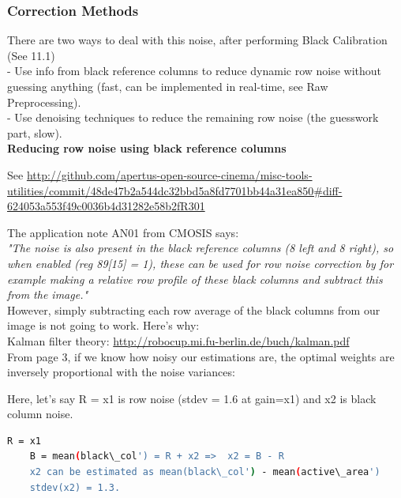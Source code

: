 \subsubsection{Correction Methods}

There are two ways to deal with this noise, after performing Black Calibration (See 11.1)\\

- Use info from black reference columns to reduce dynamic row noise without guessing anything (fast, can be implemented in real-time, see Raw Preprocessing).\\
- Use denoising techniques to reduce the remaining row noise (the guesswork part, slow).\\

\textbf{Reducing row noise using black reference columns}

See \href{http://github.com/apertus-open-source-cinema/misc-tools-utilities/commit/48de47b2a544dc32bbd5a8fd7701bb44a31ea850#diff-624053a553f49c0036b4d31282e58b2fR301}{http://github.com/apertus-open-source-cinema/misc-tools-utilities/commit/48de47b2a544dc32bbd5a8fd7701bb44a31ea850\#diff-624053a553f49c0036b4d31282e58b2fR301}

The application note AN01 from CMOSIS says:\\

\textit{"The noise is also present in the black reference columns (8 left and 8 right), so when enabled (reg 89[15] = 1), these can be used for row noise correction by for example making a relative row profile of these black columns and subtract this from the image."}\\

However, simply subtracting each row average of the black columns from our image is not going to work. Here's why:\\

Kalman filter theory: \href{http://robocup.mi.fu-berlin.de/buch/kalman.pdf}{http://robocup.mi.fu-berlin.de/buch/kalman.pdf} \\

From page 3, if we know how noisy our estimations are, the optimal weights are inversely proportional with the noise variances:\\


Here, let's say R = x1 is row noise (stdev = 1.6 at gain=x1) and x2 is black column noise. 

\begin{lstlisting}[language=bash,morekeywords=$,keywordstyle=\bfseries,frame=none,xleftmargin=.25in,belowskip=2em, aboveskip=2em]
    R = x1
    B = mean(black\_col') = R + x2 =>  x2 = B - R
    x2 can be estimated as mean(black\_col') - mean(active\_area')
    stdev(x2) = 1.3.
\end{lstlisting}

